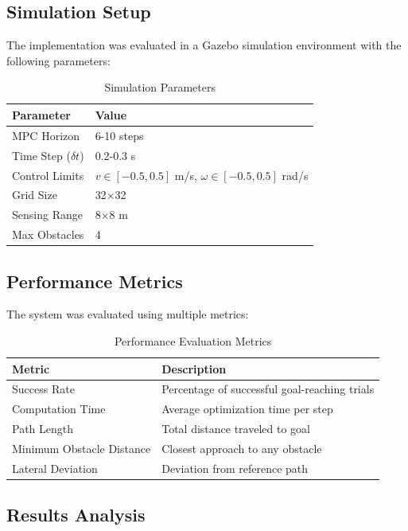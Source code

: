 \documentclass[12pt,a4paper]{article}
\begin{document}
\subsection{Simulation Setup}
The implementation was evaluated in a Gazebo simulation environment with the following parameters:

\begin{table}[h!]
\centering
\caption{Simulation Parameters}
\begin{tabular}{@{}ll@{}}
\toprule
\textbf{Parameter} & \textbf{Value} \\
\midrule
MPC Horizon & 6-10 steps \\
Time Step ($\delta t$) & 0.2-0.3 s \\
Control Limits & $v \in [-0.5, 0.5]$ m/s, $\omega \in [-0.5, 0.5]$ rad/s \\
Grid Size & 32$\times$32 \\
Sensing Range & 8$\times$8 m \\
Max Obstacles & 4 \\
\bottomrule
\end{tabular}
\end{table}

\subsection{Performance Metrics}
The system was evaluated using multiple metrics:

\begin{table}[h!]
\centering
\caption{Performance Evaluation Metrics}
\begin{tabular}{@{}ll@{}}
\toprule
\textbf{Metric} & \textbf{Description} \\
\midrule
Success Rate & Percentage of successful goal-reaching trials \\
Computation Time & Average optimization time per step \\
Path Length & Total distance traveled to goal \\
Minimum Obstacle Distance & Closest approach to any obstacle \\
Lateral Deviation & Deviation from reference path \\
\bottomrule
\end{tabular}
\end{table}

\subsection{Results Analysis}
\end{document}
